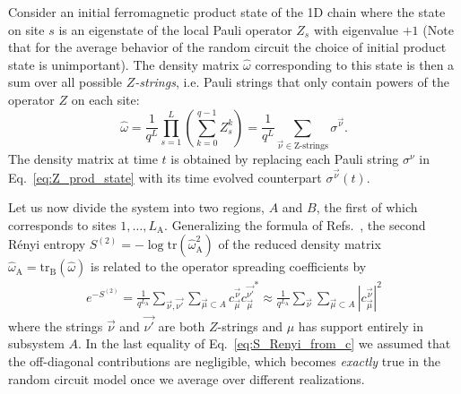 \documentclass[aps,prb,twocolumn,superscriptaddress]{revtex4-1}
\begin{document}
Consider an initial ferromagnetic product state of the 1D chain where the state on site $s$ is an eigenstate of the local Pauli operator $Z_s$ with eigenvalue $+1$ (Note that for the average behavior of the random circuit the choice of initial product state is unimportant). The density matrix $\hat\omega$ corresponding to this state is then a sum over all possible \emph{$Z$-strings}, i.e. Pauli strings that only contain powers of the operator $Z$ on each site:
\begin{equation}\label{eq:Z_prod_state}
\hat\omega = \frac{1}{q^L}\prod_{s=1}^{L} \left(\sum_{k=0}^{q-1}Z_s^k\right) = \frac{1}{q^L} \sum_{\vec{\nu}\in\text{Z-strings}}\sigma^{\vec{\nu}}.
\end{equation}
The density matrix at time $t$ is obtained by replacing each Pauli string $\sigma^\nu$ in Eq.~\eqref{eq:Z_prod_state} with its time evolved counterpart $\sigma^{\vec{\nu}}(t)$.

Let us now divide the system into two regions, $A$ and $B$, the first of which corresponds to sites $1,\ldots,L_\text{A}$. Generalizing the formula of Refs.~, the second R\'enyi entropy $S^{(2)} = -\log\text{tr}(\hat\omega_\text{A}^2)$ of the reduced density matrix $\hat\omega_\text{A} = \text{tr}_\text{B}(\hat\omega)$ is related to the operator spreading coefficients by
\begin{align}\label{eq:S_Renyi_from_c}
e^{-S^{(2)}} = \frac{1}{q^{L_\text{A}}} \sum_{\vec{\nu},\vec{\nu'}}\sum_{\vec{\mu}\subset A} c_{\vec{\mu}}^{\vec{\nu}} {c_{\vec{\mu}}^{\vec{\nu'}}}^*
\approx \frac{1}{q^{L_\text{A}}} \sum_{\vec{\nu}}\sum_{\vec{\mu}\subset A} |c_{\vec{\mu}}^{\vec{\nu}}|^2
\end{align}
where the strings $\vec{\nu}$ and $\vec{\nu'}$ are both $Z$-strings and $\mu$ has support entirely in subsystem $A$. In the last equality of Eq.~\eqref{eq:S_Renyi_from_c} we assumed that the off-diagonal contributions are negligible, which becomes \textit{exactly} true in the random circuit model once we average over different realizations.
\end{document}
